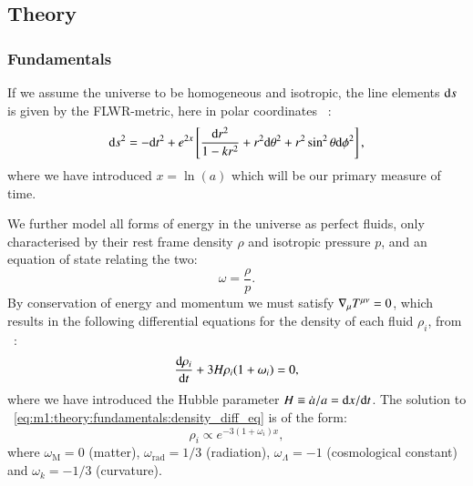 \subsection{Theory}\label{sec:m1:theory}

\subsubsection{Fundamentals}\label{sec:m1:theory:fundamentals}

    If we assume the universe to be homogeneous and isotropic, the line elements $\mathrm{d} s$ is given by the FLWR-metric, here in polar coordinates ~\cite[eq. 1.1.11]{weinberg2008cosmology}:
    \begin{equation}\label{eq:m1:theory:fundamentals:FLWR_line_element}
        \mathrm{d} s^2 = -\mathrm{d} t^2 + e^{2x}\left[ \frac{\mathrm{d} r^2}{1-kr^2}+r^2\mathrm{d}\theta^2 + r^2\sin^2\theta\mathrm{d}\phi^2 \right],
    \end{equation}
    where we have introduced $x = \ln(a)$ which will be our primary measure of time. 

    We further model all forms of energy in the universe as perfect fluids, only characterised by their rest frame density $\rho$ and isotropic pressure $p$, and an equation of state relating the two:
    \begin{equation}\label{eq:m1:theory:fundamentals:equation_of_state}
        \omega=\frac{\rho}{p}.
    \end{equation}
    By conservation of energy and momentum we must satisfy $\nabla_\mu T^{\mu\nu}=0$, which results in the following differential equations for the density of each fluid $\rho_i$, from ~\cite{AST5220LectureNotes}:
    \begin{equation}\label{eq:m1:theory:fundamentals:density_diff_eq}
        \dv{\rho_i}{t} +3H\rho_i(1+\omega_i) = 0,
    \end{equation}
    where we have introduced the Hubble parameter $H \equiv\dot{a}/a=\mathrm{d} x/\mathrm{d} t$. The solution to ~\cref{eq:m1:theory:fundamentals:density_diff_eq} is of the form:
    \begin{equation}\label{eq:m1:theory:fundamentals:solution_to_density_diff_eq}
        \rho_i \propto e^{-3(1+\omega_i)x},
    \end{equation}
    where $\omega_\mathrm{M} = 0$ (matter), $\omega_\mathrm{rad}=1/3$ (radiation), $\omega_\Lambda=-1$ (cosmological constant) and $\omega_k=-1/3$ (curvature). 

